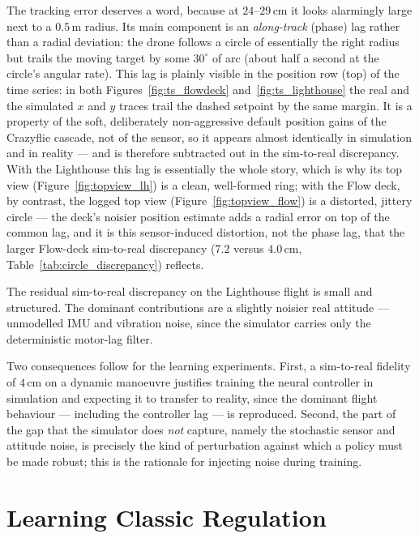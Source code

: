 \documentclass[11pt,a4paper]{article}
\theoremstyle{remark}
\numberwithin{equation}{section}
\begin{document}
The tracking error deserves a word, because at $24$--$29\,\mathrm{cm}$ it looks
alarmingly large next to a $0.5\,\mathrm{m}$ radius. Its main component is an
\emph{along-track} (phase) lag rather than a radial deviation: the drone follows
a circle of essentially the right radius but trails the moving target by some
$30^\circ$ of arc (about half a second at the circle's angular rate). This lag is
plainly visible in the position row (top) of the time series: in both
Figures~\ref{fig:ts_flowdeck} and~\ref{fig:ts_lighthouse} the real and the
simulated $x$ and $y$ traces trail the dashed setpoint by the same margin. It is a
property of the soft, deliberately non-aggressive default position gains of the
Crazyflie cascade, not of the sensor, so it appears almost identically in
simulation and in reality --- and is therefore subtracted out in the sim-to-real
discrepancy. With the Lighthouse this lag is essentially the whole story, which is
why its top view (Figure~\ref{fig:topview_lh}) is a clean, well-formed ring; with
the Flow deck, by contrast, the logged top view (Figure~\ref{fig:topview_flow}) is
a distorted, jittery circle --- the deck's noisier position estimate adds a radial
error on top of the common lag, and it is this sensor-induced distortion, not the
phase lag, that the larger Flow-deck sim-to-real discrepancy ($7.2$ versus
$4.0\,\mathrm{cm}$, Table~\ref{tab:circle_discrepancy}) reflects.

The residual sim-to-real discrepancy on the Lighthouse flight is small and
structured. The dominant contributions are a slightly noisier real attitude ---
unmodelled IMU and vibration noise, since the simulator carries only the
deterministic motor-lag filter.

Two consequences follow for the learning experiments. First, a sim-to-real
fidelity of $4\,\mathrm{cm}$ on a dynamic manoeuvre justifies training the neural
controller in simulation and expecting it to transfer to reality, since the dominant flight
behaviour --- including the controller lag --- is reproduced. Second, the part of
the gap that the simulator does \emph{not} capture, namely the stochastic
sensor and attitude noise, is precisely the kind of perturbation against which a
policy must be made robust; this is the rationale for injecting noise during
training.

\newpage
\section{Learning Classic Regulation}\label{sec:regulation}
\end{document}
